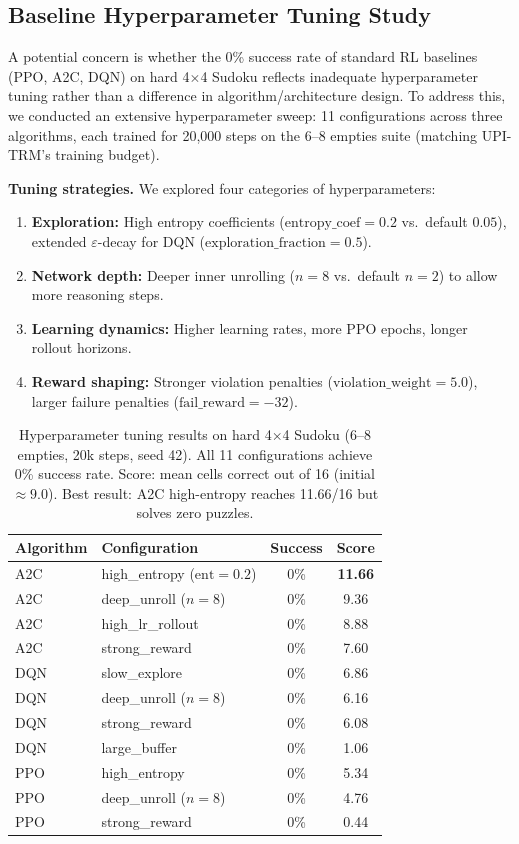 \documentclass{article}
\theoremstyle{plain}
\theoremstyle{definition}
\theoremstyle{remark}
\begin{document}
\subsection{Baseline Hyperparameter Tuning Study}
\label{app:baseline_tuning}

A potential concern is whether the 0\% success rate of standard RL baselines (PPO, A2C, DQN) on hard 4$\times$4 Sudoku reflects inadequate hyperparameter tuning rather than a difference in algorithm/architecture design.
To address this, we conducted an extensive hyperparameter sweep: 11 configurations across three algorithms, each trained for 20,000 steps on the 6--8 empties suite (matching UPI-TRM's training budget).

\textbf{Tuning strategies.}
We explored four categories of hyperparameters:
\begin{enumerate}[nosep]
\item \textbf{Exploration:} High entropy coefficients ($\mathrm{entropy\_coef}{=}0.2$ vs.\ default $0.05$), extended $\varepsilon$-decay for DQN ($\mathrm{exploration\_fraction}{=}0.5$).
\item \textbf{Network depth:} Deeper inner unrolling ($n{=}8$ vs.\ default $n{=}2$) to allow more reasoning steps.
\item \textbf{Learning dynamics:} Higher learning rates, more PPO epochs, longer rollout horizons.
\item \textbf{Reward shaping:} Stronger violation penalties ($\mathrm{violation\_weight}{=}5.0$), larger failure penalties ($\mathrm{fail\_reward}{=}{-}32$).
\end{enumerate}

\begin{table}[t]
\caption{Hyperparameter tuning results on hard 4$\times$4 Sudoku (6--8 empties, 20k steps, seed 42).
All 11 configurations achieve 0\% success rate.
Score: mean cells correct out of 16 (initial ${\approx}9.0$).
Best result: A2C high-entropy reaches 11.66/16 but solves zero puzzles.}
\label{tab:baseline_tuning}
\centering
\small
\begin{tabular}{llcc}
\toprule
Algorithm & Configuration & Success & Score \\
\midrule
A2C & high\_entropy ($\mathrm{ent}{=}0.2$) & 0\% & \textbf{11.66} \\
A2C & deep\_unroll ($n{=}8$) & 0\% & 9.36 \\
A2C & high\_lr\_rollout & 0\% & 8.88 \\
A2C & strong\_reward & 0\% & 7.60 \\
\midrule
DQN & slow\_explore & 0\% & 6.86 \\
DQN & deep\_unroll ($n{=}8$) & 0\% & 6.16 \\
DQN & strong\_reward & 0\% & 6.08 \\
DQN & large\_buffer & 0\% & 1.06 \\
\midrule
PPO & high\_entropy & 0\% & 5.34 \\
PPO & deep\_unroll ($n{=}8$) & 0\% & 4.76 \\
PPO & strong\_reward & 0\% & 0.44 \\
\bottomrule
\end{tabular}
\end{table}
\end{document}
